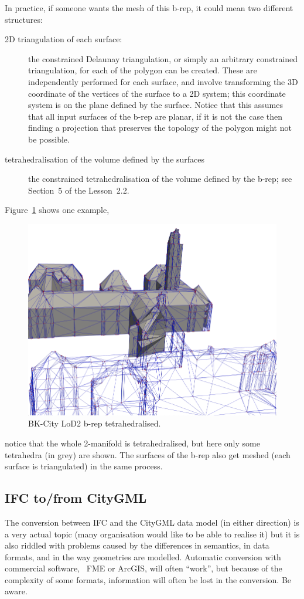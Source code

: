 In practice, if someone wants the mesh of this b-rep, it could mean two different structures:
\begin{description}
  \item[2D triangulation of each surface:] the constrained Delaunay triangulation, or simply an arbitrary constrained triangulation, for each of the polygon can be created. These are independently performed for each surface, and involve transforming the 3D coordinate of the vertices of the surface to a 2D system; this coordinate system is on the plane defined by the surface. Notice that this assumes that all input surfaces of the b-rep are planar, if it is not the case then finding a projection that preserves the topology of the polygon might not be possible.
  \item[tetrahedralisation of the volume defined by the surfaces] the constrained tetrahedralisation of the volume defined by the b-rep; see Section~5 of the Lesson~2.2.
\end{description}

Figure~\ref{fig:meshing} shows one example,
\begin{figure}
  \centering
  \includegraphics[width=0.65\linewidth]{figs/mesh1}
  \caption{BK-City LoD2 b-rep tetrahedralised.}%
\label{fig:meshing}
\end{figure}
notice that the whole 2-manifold is tetrahedralised, but here only some tetrahedra (in grey) are shown. 
The surfaces of the b-rep also get meshed (each surface is triangulated) in the same process.


\subsection{IFC to/from CityGML}

The conversion between IFC and the CityGML data model (in either direction) is a very actual topic (many organisation would like to be able to realise it) but it is also riddled with problems caused by the differences in semantics, in data formats, and in the way geometries are modelled.
Automatic conversion with commercial software, \eg\ FME or ArcGIS, will often ``work'', but because of the complexity of some formats, information will often be lost in the conversion. 
Be aware.

